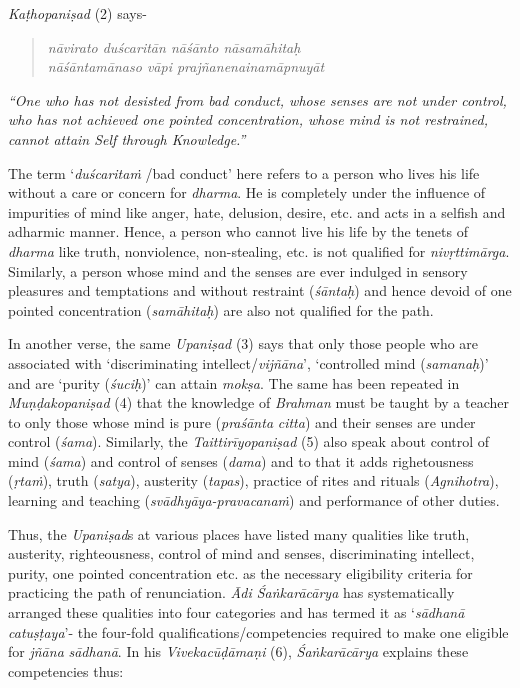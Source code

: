 \emph{Kaṭhopaniṣad} (2) says-

\begin{verse}
\emph{nāvirato duścaritān nāśānto nāsamāhitaḥ }\\
\emph{nāśāntamānaso vāpi prajñanenainamāpnuyāt  }
\end{verse}

\emph{``One who has not desisted from bad conduct, whose senses are not under control, who has not achieved one pointed concentration, whose mind is not restrained, cannot attain Self through Knowledge.''}

The term `\emph{duścaritaṁ} /bad conduct' here refers to a person who lives his life without a care or concern for \emph{dharma}. He is completely under the influence of impurities of mind like anger, hate, delusion, desire, etc. and acts in a selfish and adharmic manner. Hence, a person who cannot live his life by the tenets of \emph{dharma} like truth, nonviolence, non-stealing, etc. is not qualified for \emph{nivṛttimārga}. Similarly, a person whose mind and the senses are ever indulged in sensory pleasures and temptations and without restraint (\emph{śāntaḥ}) and hence devoid of one pointed concentration (\emph{samāhitaḥ}) are also not qualified for the path.

In another verse, the same \emph{Upaniṣad} (3) says that only those people who are associated with `discriminating intellect/\emph{vijñāna}', `controlled mind (\emph{samanaḥ})' and are `purity (\emph{śuciḥ})' can attain \emph{mokṣa}. The same has been repeated in \emph{Muṇḍakopaniṣad} (4) that the knowledge of \emph{Brahman} must be taught by a teacher to only those whose mind is pure (\emph{praśānta} \emph{citta}) and their senses are under control (\emph{śama}). Similarly, the \emph{Taittirīyopaniṣad} (5) also speak about control of mind (\emph{śama}) and control of senses (\emph{dama}) and to that it adds righetousness (\emph{ṛtaṁ}), truth (\emph{satya}), austerity (\emph{tapas}), practice of rites and rituals (\emph{Agnihotra}), learning and teaching (\emph{svādhyāya-pravacanaṁ}) and performance of other duties.

Thus, the \emph{Upaniṣad}s at various places have listed many qualities like truth, austerity, righteousness, control of mind and senses, discriminating intellect, purity, one pointed concentration etc. as the necessary eligibility criteria for practicing the path of renunciation. \emph{Ādi Śaṅkarācārya} has systematically arranged these qualities into four categories and has termed it as `\emph{sādhanā} \emph{catuṣṭaya}'- the four-fold qualifications/competencies required to make one eligible for \emph{jñāna} \emph{sādhanā}. In his \emph{Vivekacūḍāmaṇi} (6), \emph{Śaṅkarācārya} explains these competencies thus:

